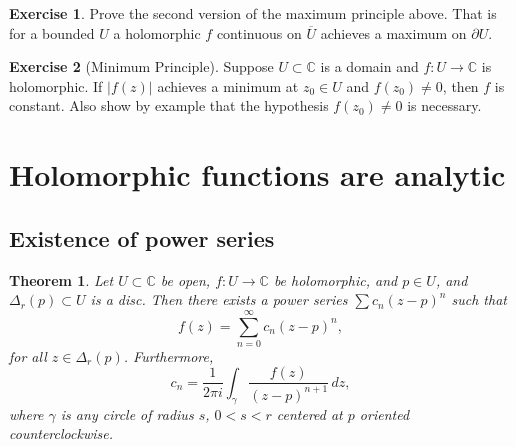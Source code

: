 \documentclass[12pt,openany]{book}
\newcommand{\sabs}[1]{\lvert {#1} \rvert}
\newcommand{\C}{{\mathbb{C}}}
\theoremstyle{plain}
\newtheorem{thm}{Theorem}[section]
\theoremstyle{remark}
\theoremstyle{definition}
\newenvironment{exbox}{%
    \def\FrameCommand{\vrule width 1pt \relax\hspace {10pt}}%
    \MakeFramed {\advance \hsize -\width \FrameRestore }%
}{%
    \endMakeFramed
}
\theoremstyle{exercise}
\newtheorem{exercise}{Exercise}[section]
\theoremstyle{example}
\begin{document}
\begin{exbox}
\begin{exercise}
Prove the second version of the maximum principle above.
That is for a bounded $U$ a holomorphic $f$ continuous
on $\overline{U}$ achieves a maximum on $\partial U$.
\end{exercise}

\begin{exercise}[Minimum Principle]
Suppose $U \subset \C$ is a domain and
$f \colon U \to \C$ is holomorphic.
If $\sabs{f(z)}$ achieves a minimum at $z_0 \in U$ and $f(z_0) \not= 0$,
then $f$ is constant.  Also show by example that the hypothesis $f(z_0)
\not= 0$ is necessary.
\end{exercise}
\end{exbox}


\section{Holomorphic functions are analytic}
\label{sec:holoanal}

\subsection{Existence of power series}

\begin{thm} \label{thm:holpower}
Let $U \subset \C$ be open, $f \colon U \to \C$ be
holomorphic, and $p \in U$, and $\Delta_r(p) \subset U$
is a disc.
Then there exists a power series $\sum c_n {(z-p)}^n$
such that
\begin{equation*}
f(z) = \sum_{n=0}^\infty c_n {(z-p)}^n ,
\end{equation*}
for all $z \in \Delta_r(p)$.
Furthermore,
\begin{equation*}
c_n = 
\frac{1}{2\pi i}
\int_{\gamma}
\frac{f(z)}{{(z-p)}^{n+1}}
\,
dz  ,
\end{equation*}
where $\gamma$ is any circle of radius $s$, $0 < s < r$ centered at
$p$ oriented counterclockwise.
\end{thm}
\end{document}
